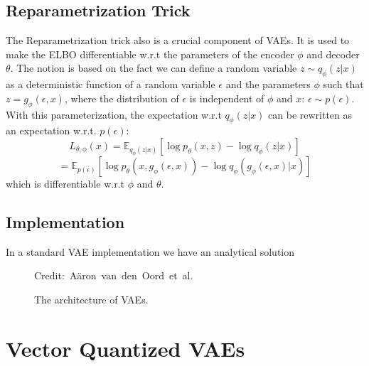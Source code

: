 \subsection{Reparametrization Trick}

The Reparametrization trick also  is a crucial component of VAEs. It is used to make the ELBO differentiable w.r.t the parameters of the encoder $\phi$ and decoder $\theta$. The notion is based on the fact we can define a random variable $z \sim q_{\phi}(z|x)$ as a deterministic function of a random variable $\epsilon$ and the parameters $\phi$ such that $z = g_{\phi}(\epsilon, x)$, where the distribution of $\epsilon$ is independent of $\phi$ and $x$: $\epsilon \sim p(\epsilon)$. With this parameterization, the expectation w.r.t $q_{\phi}(z|x)$ can be rewritten as an expectation w.r.t. $p(\epsilon)$: \[ L_{\theta, \phi}(x) = \mathbb{E}_{q_{\phi}(z|x)} [\log p_{\theta}(x, z) - \log q_{\phi}(z|x)] \]
\[ = \mathbb{E}_{p(\epsilon)} [\log p_{\theta}(x, g_{\phi}(\epsilon, x)) - \log q_{\phi}(g_{\phi}(\epsilon, x)|x)] \] which is differentiable w.r.t $\phi$ and $\theta$.

\subsection{Implementation}

In a standard VAE implementation we have an analytical solution 

\begin{figure}[H]
    \centering

    \caption{ The architecture of VAEs.}
  	\medskip 
	\hspace*{15pt}\hbox{\scriptsize Credit: Aäron van den Oord et al.}
    \label{VAEFigure}

\end{figure}

\section{Vector Quantized VAEs}

